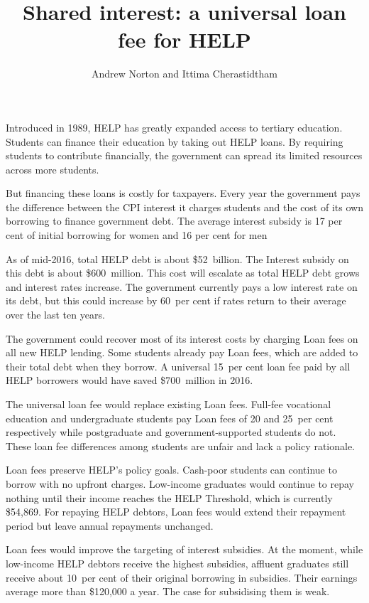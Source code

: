 \documentclass[embargoed]{grattan}
\title{Shared interest: a universal loan fee for \gls{HELP}}
\author{Andrew Norton and Ittima Cherastidtham}
\begin{document}
\setlength{\overviewExtra}{-3pt}
\begin{overview}
Introduced in 1989, \gls{HELP} has greatly expanded access to tertiary education.
Students can finance their education by taking out \gls{HELP} loans.
By requiring students to contribute financially, the government can spread its limited resources across more students.

But financing these loans is costly for taxpayers.
Every year the government pays the difference between the \gls{CPI} interest it charges students and the cost of its own borrowing to finance government debt. The average interest subsidy is 17 per cent of initial borrowing for women and 16 per cent for men

As of mid-2016, total \gls{HELP} debt is about \$52~billion.
The \gls{Interest subsidy} on this debt is about \$600~million.
This cost will escalate as total \gls{HELP} debt grows and interest rates increase.
The government currently pays a low interest rate on its debt, but this could increase by 60~per cent if rates return to their average over the last ten years.

The government could recover most of its interest costs by charging \gls{Loan fees} on all new \gls{HELP} lending.
Some students already pay \gls{Loan fees}, which are added to their total debt when they borrow.
A universal 15~per cent loan fee paid by all \gls{HELP} borrowers would have saved \$700~million in 2016.

The universal loan fee would replace existing \gls{Loan fees}.
Full-fee vocational education and undergraduate students pay \gls{Loan fees} of 20 and 25~per cent respectively while postgraduate and government-supported students do not.
These loan fee differences among students are unfair and lack a policy rationale.

\Gls{Loan fees} preserve \gls{HELP}'s policy goals.
Cash-poor students can continue to borrow with no upfront charges.
Low-income graduates would continue to repay nothing until their income reaches the \gls{HELP} \gls{Threshold}, which is currently \$54,869.
For repaying \gls{HELP} debtors, \gls{Loan fees} would extend their repayment period but leave annual repayments unchanged.

Loan fees would improve the targeting of interest subsidies.
At the moment, while low-income \gls{HELP} debtors receive the highest subsidies, affluent graduates still receive about 10~per cent of their original borrowing in subsidies.
Their earnings average more than \$120,000 a year.
The case for subsidising them is weak.


\end{overview}
\end{document}
